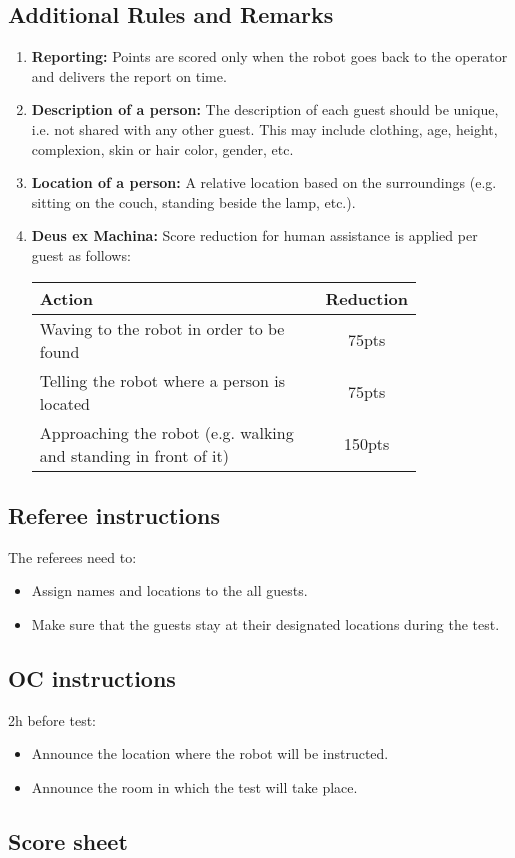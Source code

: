 \subsection*{Additional Rules and Remarks}
\begin{enumerate}[nosep]
	\item \textbf{Reporting:} Points are scored only when the robot goes back to the operator and delivers the report on time.

	\item \textbf{Description of a person:} The description of each guest should be unique, i.e. not shared with any other guest. This may include clothing, age, height, complexion, skin or hair color, gender, etc.

	\item \textbf{Location of a person:} A relative location based on the surroundings (e.g. sitting on the couch, standing beside the lamp, etc.).

	\item \textbf{Deus ex Machina:} Score reduction for human assistance is applied per guest as follows:
	\begin{table}[h]
		\begin{tabular}{m{0.8\linewidth} c}
			\textbf{Action} & \textbf{Reduction} \\\hline
			Waving to the robot in order to be found & 75pts \\
			Telling the robot where a person is located & 75pts \\
			Approaching the robot (e.g. walking and standing in front of it) & 150pts \\\hline
		\end{tabular}
	\end{table}
\end{enumerate}

\subsection*{Referee instructions}

The referees need to:
\begin{itemize}
	\item Assign names and locations to the all guests.
	\item Make sure that the guests stay at their designated locations during the test.
\end{itemize}

\subsection*{OC instructions}

2h before test:
\begin{itemize}
	\item Announce the location where the robot will be instructed.
	\item Announce the room in which the test will take place.
\end{itemize}

\subsection*{Score sheet}

